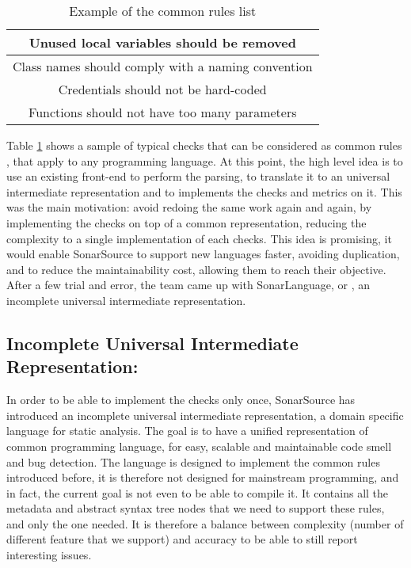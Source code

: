 \begin{table}[h]
\centering
\caption{Example of the common rules list}
\label{table:common_rules}
	\begin{tabular}{|c|}
		\hline
		Unused local variables should be removed  \\ \hline
		Class names should comply with a naming convention \\ \hline
		Credentials should not be hard-coded \\ \hline
		Functions should not have too many parameters \\ \hline
	\end{tabular}
\end{table}

Table \ref{table:common_rules} shows a sample of typical checks that can be considered as common rules \cite{JiraSonarSource:2019:Online}, that apply to any programming language.
At this point, the high level idea is to use an existing front-end to perform the parsing, to translate it to an universal intermediate representation and to implements the checks and metrics on it.
This was the main motivation: avoid redoing the same work again and again, by implementing the checks on top of a common representation, reducing the complexity to a single implementation of each checks.
This idea is promising, it would enable SonarSource to support new languages faster, avoiding duplication, and to reduce the maintainability cost, allowing them to reach their objective.
After a few trial and error, the team came up with SonarLanguage, or \slang{}, an incomplete universal intermediate representation. 


\subsection{Incomplete Universal Intermediate Representation: \slang{}}
\label{subsec:slang}

In order to be able to implement the checks only once, SonarSource has introduced an incomplete universal intermediate representation, a domain specific language for static analysis. 
The goal is to have a unified representation of common programming language, for easy, scalable and maintainable code smell and bug detection. 
The language is designed to implement the common rules introduced before, it is therefore not designed for mainstream programming, and in fact, the current goal is not even to be able to compile it.
It contains all the metadata and abstract syntax tree nodes that we need to support these rules, and only the one needed.
It is therefore a balance between complexity (number of different feature that we support) and accuracy to be able to still report interesting issues. 

